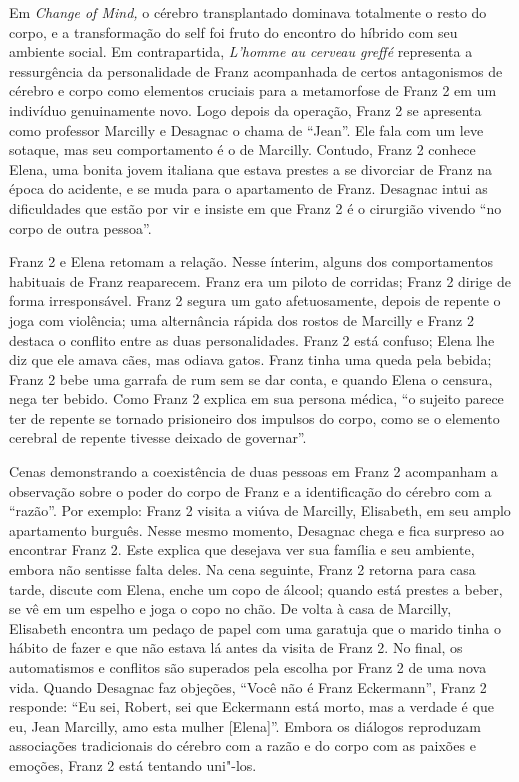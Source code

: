 Em \emph{Change of Mind,} o cérebro transplantado dominava totalmente o
resto do corpo, e a transformação do self foi fruto do encontro do
híbrido com seu ambiente social. Em contrapartida, \emph{L'homme au
cerveau greffé} representa a ressurgência da personalidade de Franz
acompanhada de certos antagonismos de cérebro e corpo como elementos
cruciais para a metamorfose de Franz 2 em um indivíduo genuinamente
novo. Logo depois da operação, Franz 2 se apresenta como professor
Marcilly e Desagnac o chama de ``Jean''. Ele fala com um leve sotaque,
mas seu comportamento é o de Marcilly. Contudo, Franz 2 conhece Elena,
uma bonita jovem italiana que estava prestes a se divorciar de Franz na
época do acidente, e se muda para o apartamento de Franz. Desagnac intui
as dificuldades que estão por vir e insiste em que Franz 2 é o cirurgião
vivendo ``no corpo de outra pessoa''.

Franz 2 e Elena retomam a relação. Nesse ínterim, alguns dos
comportamentos habituais de Franz reaparecem. Franz era um piloto de
corridas; Franz 2 dirige de forma irresponsável. Franz 2 segura um gato
afetuosamente, depois de repente o joga com violência; uma alternância
rápida dos rostos de Marcilly e Franz 2 destaca o conflito entre as duas
personalidades. Franz 2 está confuso; Elena lhe diz que ele amava cães,
mas odiava gatos. Franz tinha uma queda pela bebida; Franz 2 bebe uma
garrafa de rum sem se dar conta, e quando Elena o censura, nega ter
bebido. Como Franz 2 explica em sua persona médica, ``o sujeito parece
ter de repente se tornado prisioneiro dos impulsos do corpo, como se o
elemento cerebral de repente tivesse deixado de governar''.

Cenas demonstrando a coexistência de duas pessoas em Franz 2 acompanham
a observação sobre o poder do corpo de Franz e a identificação do
cérebro com a ``razão''. Por exemplo: Franz 2 visita a viúva de
Marcilly, Elisabeth, em seu amplo apartamento burguês. Nesse mesmo
momento, Desagnac chega e fica surpreso ao encontrar Franz 2. Este
explica que desejava ver sua família e seu ambiente, embora não sentisse
falta deles. Na cena seguinte, Franz 2 retorna para casa tarde, discute
com Elena, enche um copo de álcool; quando está prestes a beber, se vê
em um espelho e joga o copo no chão. De volta à casa de Marcilly,
Elisabeth encontra um pedaço de papel com uma garatuja que o marido
tinha o hábito de fazer e que não estava lá antes da visita de Franz 2.
No final, os automatismos e conflitos são superados pela escolha por
Franz 2 de uma nova vida. Quando Desagnac faz objeções, ``Você não é
Franz Eckermann'', Franz 2 responde: ``Eu sei, Robert, sei que Eckermann
está morto, mas a verdade é que eu, Jean Marcilly, amo esta mulher
{[}Elena{]}''. Embora os diálogos reproduzam associações tradicionais do
cérebro com a razão e do corpo com as paixões e emoções, Franz 2 está
tentando uni"-los.

